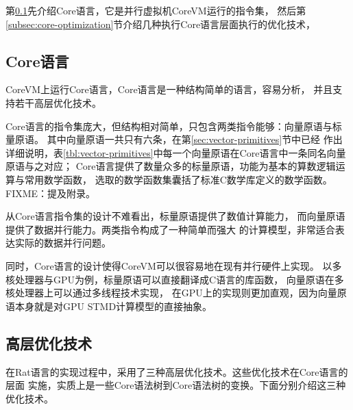 第\ref{subsec:core-language}先介绍Core语言，它是并行虚拟机CoreVM运行的指令集，
然后第\ref{subsec:core-optimization}节介绍几种执行Core语言层面执行的优化技术，

\subsection{Core语言}\label{subsec:core-language}
CoreVM上运行Core语言，Core语言是一种结构简单的语言，容易分析，
并且支持若干高层优化技术。

Core语言的指令集庞大，但结构相对简单，只包含两类指令能够：向量原语与标量原语。
其中向量原语一共只有六条，在第\ref{sec:vector-primitives}节中已经
作出详细说明，表\ref{tbl:vector-primitives}中每一个向量原语在Core语言中一条同名向量原语与之对应；
Core语言提供了数量众多的标量原语，功能为基本的算数逻辑运算与常用数学函数，
选取的数学函数集囊括了标准C数学库定义的数学函数。
FIXME：提及附录。

从Core语言指令集的设计不难看出，标量原语提供了数值计算能力，
而向量原语提供了数据并行能力。两类指令构成了一种简单而强大
的计算模型，非常适合表达实际的数据并行问题。

同时，Core语言的设计使得CoreVM可以很容易地在现有并行硬件上实现。
以多核处理器与GPU为例，标量原语可以直接翻译成C语言的库函数，
向量原语在多核处理器上可以通过多线程技术实现，
在GPU上的实现则更加直观，因为向量原语本身就是对GPU STMD计算模型的直接抽象。


\subsection{高层优化技术}
在Rat语言的实现过程中，采用了三种高层优化技术。这些优化技术在Core语言的层面
实施，实质上是一些Core语法树到Core语法树的变换。下面分别介绍这三种优化技术。

